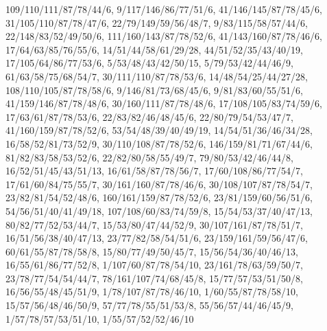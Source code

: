 {109/110/111/87/78/44/6,
9/117/146/86/77/51/6,
41/146/145/87/78/45/6,
31/105/110/87/78/47/6,
22/79/149/59/56/48/7,
9/83/115/58/57/44/6,
22/148/83/52/49/50/6,
111/160/143/87/78/52/6,
41/143/160/87/78/46/6,
17/64/63/85/76/55/6,
14/51/44/58/61/29/28,
44/51/52/35/43/40/19,
17/105/64/86/77/53/6,
5/53/48/43/42/50/15,
5/79/53/42/44/46/9,
61/63/58/75/68/54/7,
30/111/110/87/78/53/6,
14/48/54/25/44/27/28,
108/110/105/87/78/58/6,
9/146/81/73/68/45/6,
9/81/83/60/55/51/6,
41/159/146/87/78/48/6,
30/160/111/87/78/48/6,
17/108/105/83/74/59/6,
17/63/61/87/78/53/6,
22/83/82/46/48/45/6,
22/80/79/54/53/47/7,
41/160/159/87/78/52/6,
53/54/48/39/40/49/19,
14/54/51/36/46/34/28,
16/58/52/81/73/52/9,
30/110/108/87/78/52/6,
146/159/81/71/67/44/6,
81/82/83/58/53/52/6,
22/82/80/58/55/49/7,
79/80/53/42/46/44/8,
16/52/51/45/43/51/13,
16/61/58/87/78/56/7,
17/60/108/86/77/54/7,
17/61/60/84/75/55/7,
30/161/160/87/78/46/6,
30/108/107/87/78/54/7,
23/82/81/54/52/48/6,
160/161/159/87/78/52/6,
23/81/159/60/56/51/6,
54/56/51/40/41/49/18,
107/108/60/83/74/59/8,
15/54/53/37/40/47/13,
80/82/77/52/53/44/7,
15/53/80/47/44/52/9,
30/107/161/87/78/51/7,
16/51/56/38/40/47/13,
23/77/82/58/54/51/6,
23/159/161/59/56/47/6,
60/61/55/87/78/58/8,
15/80/77/49/50/45/7,
15/56/54/36/40/46/13,
16/55/61/86/77/52/8,
1/107/60/87/78/54/10,
23/161/78/63/59/50/7,
23/78/77/54/54/44/7,
78/161/107/74/68/45/8,
15/77/57/53/51/50/8,
16/56/55/48/45/51/9,
1/78/107/87/78/46/10,
1/60/55/87/78/58/10,
15/57/56/48/46/50/9,
57/77/78/55/51/53/8,
55/56/57/44/46/45/9,
1/57/78/57/53/51/10,
1/55/57/52/52/46/10}
\def\BodyMarksC{0.177/-0.211/-0.924/0.437}
\newcommand{\BodyDraw}[2]{%
\begin{scope}
  \edef\bodyvertices{\csname BodyVertices#1\endcsname}
  \edef\bodyfaces{\csname BodyFaces#1\endcsname}
  \edef\bodymarks{\csname BodyMarks#1\endcsname}
  \foreach \id/\xx/\yy in \bodyvertices
    \coordinate (body-\id) at (\xx,\yy);
  \foreach \va/\vb/\vc/\shade/\tone/\reflectance/\unc in \bodyfaces {
    \ifcase#2
      \def\facetcolor{blue!\tone!white}
      \def\edgecolor{white!48!blue}
    \or
      \def\facetcolor{black!\shade}
      \let\edgecolor\facetcolor
    \or
      \def\facetcolor{black!\reflectance}
      \let\edgecolor\facetcolor
    \or
      \edef\facetcolor{unc\unc}
      \let\edgecolor\facetcolor
    \fi
    \path[fill=\facetcolor,draw=\edgecolor,line width=.22pt,line join=round]
      (body-\va)--(body-\vb)--(body-\vc)--cycle;
  }
  \ifnum#2=0
    \draw[white!90,line width=.8pt,densely dashed]
      \csname BodyTrack#1\endcsname;
  \fi
  \foreach \rx/\ry/\bx/\by in \bodymarks {
    \draw[white,line width=2pt] (\rx,\ry) circle[radius=.095];
    \draw[blue,line width=1pt] (\rx,\ry) circle[radius=.095];
    \draw[white,line width=2pt] ({\bx-.09},{\by-.09}) rectangle ++(.18,.18);
    \draw[orange,line width=1pt] ({\bx-.09},{\by-.09}) rectangle ++(.18,.18);
  }
\end{scope}
}
